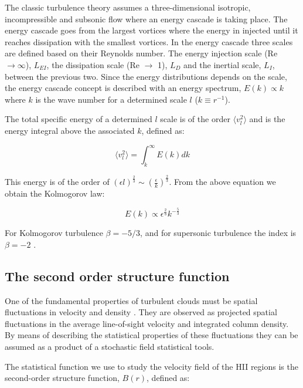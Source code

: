 \documentclass[fleqn,usenatbib, useAMS, a4paper]{mnras}
\begin{document}
The classic turbulence theory \citep{kolm1} assumes a three-dimensional isotropic, incompressible and subsonic flow where an energy cascade is taking place.
The energy cascade goes from the largest vortices where the energy in injected until it reaches dissipation with the smallest vortices.
In the energy cascade three scales are defined based on their Reynolds number.
The energy injection scale (Re $\rightarrow \infty$), $L_{EI}$, the dissipation scale (Re $\rightarrow$ 1), $L_{D}$ and the inertial scale, $L_{I}$, between the previous two.
Since the energy distributions depends on the scale, the energy cascade concept is described with an energy spectrum, $E(k) \propto k$ where $k$ is the wave number for a determined scale $l$ ($k \equiv r^{-1}$).

The total specific energy of a determined $l$ scale is of the order $\langle v_{l}^{2} \rangle$ and is the energy integral above the associated $k$, defined as:

\begin{equation}\label{eq:veles}
 \langle v_{l}^{2} \rangle = \int_{k}^{\infty} E(k)dk
\end{equation}

This energy is of the order of $(\epsilon l)^{\frac{2}{3}} \sim (\frac{\epsilon}{k})^{\frac{2}{3}}$. From the above equation we obtain the Kolmogorov law:

\begin{equation}\label{eq:kolm}
E(k) \propto \epsilon^\frac{2}{3} k^{-\frac{5}{3}}
\end{equation}

For Kolmogorov turbulence $\beta = -5 / 3$, and for supersonic turbulence the index is $\beta=-2$ \citep{burg}. 

\subsection{The second order structure function}

One of the fundamental properties of turbulent clouds must be spatial fluctuations in velocity and density \citep{1984ApJ...277..556S}.
They are observed as projected spatial fluctuations in the average line-of-sight velocity and integrated column density.
By means of describing the statistical properties of these fluctuations they can be assumed as a product of a stochastic field statistical tools.

The statistical function we use to study the velocity field of the HII regions is the second-order structure function, $B(r)$, defined as:
\end{document}
